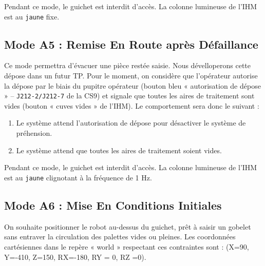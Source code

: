 Pendant ce mode, le guichet est interdit d'accès. La colonne lumineuse de l'IHM est au \texttt{jaune} fixe.

\subsection{Mode A5 : Remise En Route après Défaillance}

Ce mode  permettra d'évacuer une pièce restée saisie. Nous dévelloperons cette dépose dans un futur TP. 
Pour le moment, on considère que l'opérateur autorise la dépose par le biais du pupitre opérateur (bouton bleu « autorisation de dépose » -- \texttt{J212-2/J212-7} de la CS9) et signale que toutes les aires de traitement sont vides (bouton « cuves vides » de l'IHM).
Le comportement sera donc le suivant : 
\begin{enumerate}
    \item Le système attend l'autorisation de dépose pour désactiver le système de préhension.
    \item Le système attend que toutes les aires de traitement soient vides.
\end{enumerate}

Pendant ce mode, le guichet est interdit d'accès. La colonne lumineuse de l'IHM est au \texttt{jaune} clignotant à la fréquence de 1 Hz.

\subsection{Mode A6 : Mise En Conditions Initiales}

On souhaite positionner le robot au-dessus du guichet, prêt à saisir un gobelet sans entraver la circulation des palettes vides ou pleines.
Les coordonnées cartésiennes dans le repère « world » respectant ces contraintes sont : (X=90, Y=-410, Z=150, RX=-180, RY = 0, RZ =0).

